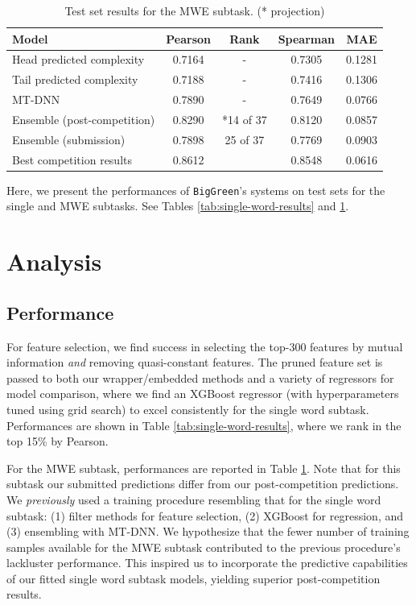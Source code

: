 \documentclass[11pt,a4paper]{article}
\begin{document}
\begin{table}[t]
  \centering
  \begin{tabular}{lcccc}
  \hline \textbf{Model} & \textbf{Pearson} & \textbf{Rank} & \textbf{Spearman} & \textbf{MAE} \\ \hline
  Head predicted complexity & 0.7164 & - & 0.7305 & 0.1281 \\
  Tail predicted complexity & 0.7188 & - & 0.7416 & 0.1306 \\
  MT-DNN & 0.7890 & - & 0.7649 & 0.0766 \\
  Ensemble (post-competition) & 0.8290 & *14 of 37 & 0.8120 & 0.0857 \\
  Ensemble (submission) & 0.7898 & 25 of 37 & 0.7769 & 0.0903 \\
  \hline
  Best competition results & 0.8612 & &  0.8548 & 0.0616 \\ 
  \hline
  \end{tabular}
  \caption{\label{tab:multi-word-results} Test set results for the MWE subtask. (* projection)}
\end{table}

Here, we present the performances of \texttt{BigGreen}'s systems on test sets for the single and MWE subtasks. See Tables \ref{tab:single-word-results} and \ref{tab:multi-word-results}.

\section{Analysis}

\subsection{Performance}

For feature selection, we find success in selecting the top-300 features by mutual information \textit{and} removing quasi-constant features. The pruned feature set is passed to both our wrapper/embedded methods and a variety of regressors for model comparison, where we find an XGBoost regressor \citep{DBLP:journals/corr/ChenG16} (with hyperparameters tuned using grid search) to excel consistently for the single word subtask. Performances are shown in Table \ref{tab:single-word-results}, where we rank in the top 15\% by Pearson. 

For the MWE subtask, performances are reported in Table \ref{tab:multi-word-results}. Note that for this subtask our submitted predictions differ from our post-competition predictions. We \textit{previously} used a training procedure resembling that for the single word subtask: (1) filter methods for feature selection, (2) XGBoost for regression, and (3) ensembling with MT-DNN. We hypothesize that the fewer number of training samples available for the MWE subtask contributed to the previous procedure's lackluster performance. This inspired us to incorporate the predictive capabilities of our fitted single word subtask models, yielding superior post-competition results.
\end{document}
